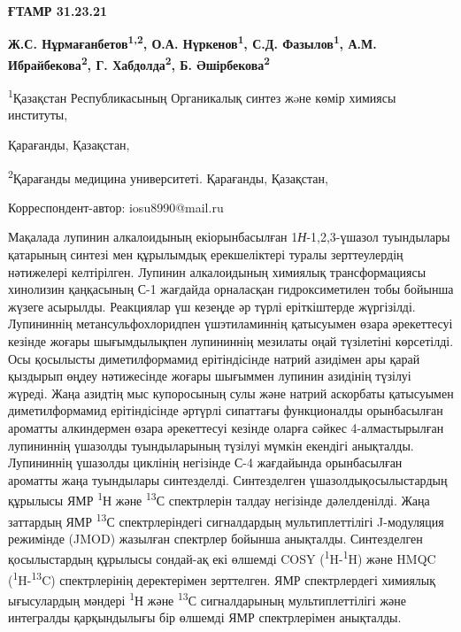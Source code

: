 \newpage
{\bfseries ҒТАМР 31.23.21}


\begin{center}
{\bfseries Ж.С. Нұрмағанбетов\textsuperscript{1,2}, О.А. Нүркенов\textsuperscript{1}, С.Д. Фазылов\textsuperscript{1}, А.М. Ибрайбекова\textsuperscript{2}, Г. Хабдолда\textsuperscript{2}, Б.
Әшірбекова\textsuperscript{2}}

\textsuperscript{1}Қазақстан Республикасының Органикалық синтез жəне
көмір химиясы институты,

Қарағанды, Қазақстан,

\textsuperscript{2}Қарағанды медицина университеті. Қарағанды,
Қазақстан,

Корреспондент-автор: iosu8990@mail.ru
\end{center}

Мақалада лупинин алкалоидының екіорынбасылған 1\emph{Н}-1,2,3-үшазол
туындылары қатарының синтезі мен құрылымдық ерекшеліктері туралы
зерттеулердің нәтижелері келтірілген. Лупинин алкалоидының химиялық
трансформациясы хинолизин қаңқасының С-1 жағдайда орналасқан
гидроксиметилен тобы бойынша жүзеге асырылды. Реакциялар үш кезеңде әр
түрлі еріткіштерде жүргізілді. Лупининнің метансульфохлоридпен
үшэтиламиннің қатысуымен өзара әрекеттесуі кезінде жоғары шығымдылықпен
лупининнің мезилаты оңай түзілетіні көрсетілді. Осы қосылысты
диметилформамид ерітіндісінде натрий азидімен ары қарай қыздырып өңдеу
нәтижесінде жоғары шығыммен лупинин азидінің түзілуі жүреді. Жаңа
азидтің мыс купоросының сулы және натрий аскорбаты қатысуымен
диметилформамид ерітіндісінде әртүрлі сипаттағы функционалды
орынбасылған ароматты алкиндермен өзара әрекеттесуі кезінде оларға
сәйкес 4-алмастырылған лупининнің үшазолды туындыларының түзілуі мүмкін
екендігі анықталды. Лупининнің үшазолды циклінің негізінде С-4
жағдайында орынбасылған ароматты жаңа туындылары синтезделді.
Синтезделген үшазолдықосылыстардың құрылысы ЯМР \textsuperscript{1}Н
және \textsuperscript{13}С спектрлерін талдау негізінде дәлелденілді.
Жаңа заттардың ЯМР \textsuperscript{13}С спектрлеріндегі сигналдардың
мультиплеттілігі J-модуляция режимінде (JMOD) жазылған спектрлер бойынша
анықталды. Синтезделген қосылыстардың құрылысы сондай-ақ екі өлшемді
COSY (\textsuperscript{1}H-\textsuperscript{1}H) және HMQC
(\textsuperscript{1}H-\textsuperscript{13}C) спектрлерінің деректерімен
зерттелген. ЯМР спектрлердегі химиялық ығысулардың мәндері
\textsuperscript{1}Н және \textsuperscript{13}С сигналдарының
мультиплеттілігі және интегралды қарқындылығы бір өлшемді ЯМР
спектрлерімен анықталды.

